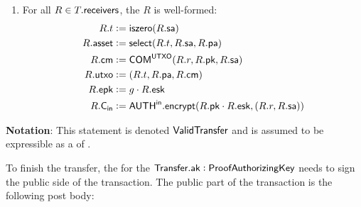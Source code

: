 \begin{definition}
\begin{enumerate}
        \item For all $R \in T.{\textsf{receivers}}$, the \Receiver{} $R$ is well-formed:
            \begin{align*}
                R.t      &:= {\textsf{iszero}}(R.{\textsf{sa}}) \\
                R.{\textsf{asset}} &:= {\textsf{select}}(R.t, R.{\textsf{sa}}, R.{\textsf{pa}}) \\
                R.{\textsf{cm}}    &:= {\textsf{COM}}^{{\textsf{UTXO}}}(R.r, R.{\textsf{pk}}, R.{\textsf{sa}}) \\
                R.{\textsf{utxo}}  &:= (R.t, R.{\textsf{pa}}, R.{\textsf{cm}}) \\
                R.{\textsf{epk}}   &:= g \cdot R.{\textsf{esk}} \\
                R.{\textsf{C}_\textsf{in}}   &:= {{\textsf{AUTH}}^\textsf{in}}.{\textsf{encrypt}}(R.{\textsf{pk}} \cdot R.{\textsf{esk}}, (R.r, R.{\textsf{sa}}))
            \end{align*}
    \end{enumerate}
    \textbf{Notation}: This statement is denoted ${\textsf{ValidTransfer}}$ and is assumed to be expressible as a \Statement{} of \NIZK{}.
\end{definition}

To finish the transfer, the \SpendingKey{} for the ${\textsf{Transfer}}.{\textsf{ak}} : {\textsf{ProofAuthorizingKey}}$ needs to sign the public side of the transaction. The public part of the transaction is the following post body:

